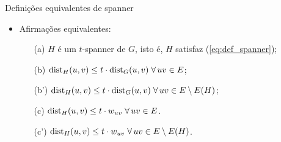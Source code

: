 \documentclass[dvipsnames]{beamer}
\newcommand{\dist}{{\rm dist}}
\begin{document}
\begin{frame}{Definições equivalentes de spanner \hyperlink{span}{\beamergotobutton{$\leftarrow$}}}
  \hypertarget{def_span}{}
  \begin{itemize}
    \item Afirmações equivalentes:
      \begin{itemize}
        \item[{\rm (a)}] $H$ é um $t$-spanner de $G$, isto é, $H$ satisfaz (\ref{eq:def_spanner});
        \item[{\rm (b)}] $\dist_{H}(u,v) \le t \cdot \dist_{G}(u,v) \;\forall\,uv \in E$;
        \item[{\rm (b')}] $\dist_{H}(u,v) \le t \cdot \dist_{G}(u,v) \;\forall\,uv \in E \setminus E(H)$;
        \item[{\rm (c)}] $\dist_{H}(u,v) \le t \cdot w_{uv} \;\forall\,uv \in E$.
        \item[{\rm (c')}] $\dist_{H}(u,v) \le t \cdot w_{uv} \;\forall\,uv \in E \setminus E(H)$.
        \end{itemize}
    \end{itemize}
\end{frame}




\end{document}
